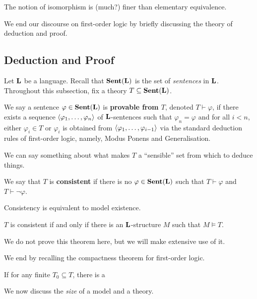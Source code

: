 \begin{boxwarning}
    The notion of isomorphism is (much?) finer than elementary equivalence.
\end{boxwarning} %

We end our discourse on first-order logic by briefly discussing the theory of deduction and proof.

\subsection{Deduction and Proof}

Let $\mathbf{L}$ be a language. Recall that $\mathbf{Sent}\!\left( \mathbf{L} \right)$ is the set of \textit{sentences} in $\mathbf{L}$. Throughout this subsection, fix a theory $T \subseteq \mathbf{Sent}\!\left( \mathbf{L} \right)$.

\begin{boxdefinition}[Provability]
    We say a sentence $\varphi \in \mathbf{Sent}\!\left( \mathbf{L} \right)$ is \textbf{provable from $T$}, denoted $T \vdash \varphi$, if there exists a sequence $\left\langle \varphi_1, \ldots, \varphi_n \right\rangle$ of $\mathbf{L}$-sentences such that $\varphi_n = \varphi$ and for all $i < n$, either $\varphi_i \in T$ or $\varphi_{i}$ is obtained from $\left\langle \varphi_1, \ldots, \varphi_{i - 1} \right\rangle$ via the standard deduction rules of first-order logic, namely, Modus Ponens and Generalisation.
\end{boxdefinition}

We can say something about what makes $T$ a ``sensible'' set from which to deduce things.

\begin{boxdefinition}[Consistency]
    We say that $T$ is \textbf{consistent} if there is no $\varphi \in \mathbf{Sent}\!\left( \mathbf{L} \right)$ such that $T \vdash \varphi$ and $T \vdash \neg\varphi$.
\end{boxdefinition}

Consistency is equivalent to model existence.

\begin{boxtheorem}
    $T$ is consistent if and only if there is an $\mathbf{L}$-structure $M$ such that $M \models T$.
\end{boxtheorem}

We do not prove this theorem here, but we will make extensive use of it.

We end by recalling the compactness theorem for first-order logic.

\begin{boxtheorem}
    If for any finite $T_0 \subseteq T$, there is a 
\end{boxtheorem}

We now discuss the \textit{size} of a model and a theory.